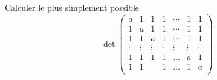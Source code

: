 \begin{exercice}\label{exoLineraire0031}

	Calculer le plus simplement possible
	\begin{equation}
		\det\begin{pmatrix}
			a	&	1	&	1	&	1	&	\cdots	&	1	&	1\\ 
			1	&	a	&	1	&	1	&	\cdots	&	1	&	1\\ 
			1	&	1	&	a	&	1	&	\cdots	&	1	&	1\\ 
			\vdots	&	\vdots	&	\vdots	&	\vdots	&	\vdots	&	\vdots	&	\vdots\\ 
			1	&	1	&	1	&	1	&	\ldots	&	a	&	1\\ 
			1	&	1	&		&	1	&	\ldots	&	1	&	a\\ 
			 \end{pmatrix}
	\end{equation}


\end{exercice}
